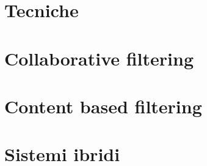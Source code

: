 \section{Tecniche}\label{tecniche}

\section{Collaborative filtering}\label{collaborative-filtering}

\section{Content based filtering}\label{content-based-filtering}

\section{Sistemi ibridi}\label{sistemi-ibridi}
